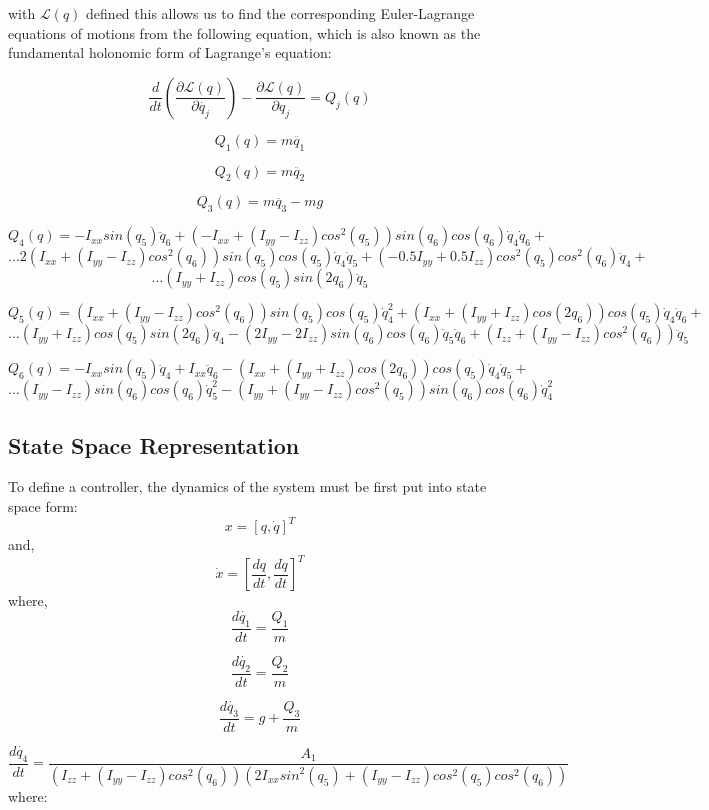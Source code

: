 \documentclass[10pt, letterpaper]{article}
\begin{document}
with $\mathcal{L}(q)$ defined this allows us to find the corresponding
Euler-Lagrange equations of motions from the following equation, which is also known as the fundamental holonomic form of Lagrange's equation:

\[
\frac{d}{dt}(\frac{\partial\mathcal{L}(q)}{\partial\dot{q_{j}}})-\frac{\partial\mathcal{L}(q)}{\partial q_{j}}=Q_{j}(q)
\]

\[
Q_{1}(q)=m\ddot{q_{1}}
\]

\[
Q_{2}(q)=m\ddot{q_{2}}
\]

\[
Q_{3}(q)=m\ddot{q_{3}}-mg
\]

\[
Q_{4}(q) = - I_{xx} {sin}(q_{5}) \ddot{q}_{6} + (- I_{xx} + (I_{yy} - I_{zz}) {cos}^{2}(q_{5})) {sin}(q_{6}) {cos}(q_{6}) \dot{q}_{4} \dot{q}_{6} + 
\]
\[
\ldots2 (I_{xx} + (I_{yy} - I_{zz}) {cos}^{2}(q_{6})) {sin}(q_{5}) {cos}(q_{5}) \dot{q}_{4} \dot{q}_{5} + (- 0.5 I_{yy} + 0.5 I_{zz}) {cos}^{2}(q_{5}) {cos}^{2}(q_{6}) \ddot{q}_{4} +
\]
\[ 
\ldots(I_{yy} + I_{zz}) {cos}(q_{5}) {sin}(2q_{6}) \ddot{q}_{5}
\]

\[
Q_{5}(q) =(I_{xx} + (I_{yy} - I_{zz}) {cos}^{2}(q_{6})) {sin}(q_{5}) {cos}(q_{5}) \dot{q}_{4}^{2} + (I_{xx} + (I_{yy} + I_{zz}) {cos}(2 q_{6})) {cos}(q_{5}) \dot{q}_{4} \dot{q}_{6} + 
\]
\[
\ldots(I_{yy} + I_{zz}) {cos}(q_{5}) {sin}(2q_{6}) \ddot{q}_{4} - (2 I_{yy} - 2 I_{zz}) {sin}(q_{6}) {cos}(q_{6}) \dot{q}_{5} \dot{q}_{6} + (I_{zz} + (I_{yy} - I_{zz}) {cos}^{2}(q_{6})) \ddot{q}_{5}
\]

\[
Q_{6}(q)= - I_{xx} {sin}(q_{5}) \ddot{q}_{4} + I_{xx} \ddot{q}_{6} - (I_{xx} + (I_{yy} + I_{zz}) {cos}(2 q_{6})) {cos}(q_{5}) \dot{q}_{4} \dot{q}_{5} + 
\]
\[
\ldots(I_{yy} - I_{zz}) {sin}(q_{6}) {cos}(q_{6}) \dot{q}_{5}^{2} - (I_{yy} + (I_{yy} - I_{zz}) {cos}^{2}(q_{5})) {sin}(q_{6}) {cos}(q_{6}) \dot{q}_{4}^{2}
\]


\subsection*{State Space Representation}
To define a controller, the dynamics of the system must be first put into state space form:
\[
x = [q,\dot{q}]^T
\]
and,
\[
\dot{x} = [\frac{dq}{dt},\frac{d\dot{q}}{dt}]^T
\]
where,
\[\frac{d\dot{q_{1}}}{dt} = \frac{Q_{1}}{m}
\]

\[\frac{d\dot{q_{2}}}{dt} = \frac{Q_{2}}{m}
\]

\[\frac{d\dot{q_{3}}}{dt} = g + \frac{Q_{3}}{m}
\]

\[
\frac{d\dot{q_{4}}}{dt} = 
\frac{A_{1}}{(I_{zz} + (I_{yy} - I_{zz}) {cos}^{2}(q_{6})) (2 I_{xx} {sin}^{2}(q_{5}) + (I_{yy} - I_{zz}) {cos}^{2}(q_{5}) {cos}^{2}(q_{6}))}
\]
where:
\end{document}
